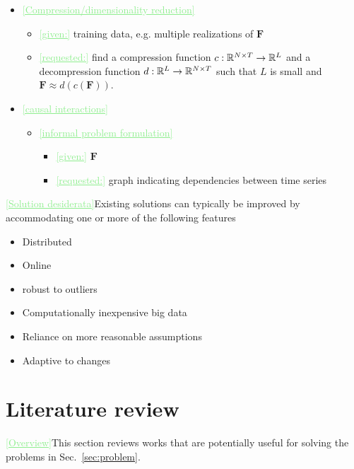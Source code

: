 \documentclass[11pt,final,onecolumn]{IEEEtran}
\newcommand{\cmt}[1]{\noindent\textcolor{lightgreen}{\underline{[#1]}}} %
\newcommand{\cmt}[1]{} %
\begin{document}
\begin{itemize}
\item\cmt{Compression/dimensionality reduction}
  \begin{itemize}
  \item \cmt{given:} training data, e.g. multiple realizations of $\bm
    F$
  \item \cmt{requested:} find a compression function
    $c:\mathbb{R}^{N\times T}\rightarrow \mathbb{R}^L$ and a decompression
    function $d:\mathbb{R}^L\rightarrow \mathbb{R}^{N\times T}$ such that
    $L$ is small and $\bm F \approx d(c(\bm F))$.
  \end{itemize}
\item\cmt{causal interactions}
  \begin{itemize}
  \item \cmt{informal problem formulation}
    \begin{itemize}
    \item \cmt{given:} $\bm F$
    \item \cmt{requested:} graph indicating dependencies between time series
    \end{itemize}
\end{itemize}
  
\end{itemize}

\cmt{Solution desiderata}Existing solutions can typically be improved
by accommodating one or more of the following features
\begin{itemize}
\item Distributed
\item Online
\item robust to outliers
\item Computationally inexpensive \ra big data
\item Reliance on more reasonable assumptions
\item Adaptive to changes
\end{itemize}





\section{Literature review}
\label{sec:literature}

\cmt{Overview}This section reviews works that are potentially useful
for solving the problems in Sec.~\ref{sec:problem}.
\end{document}
